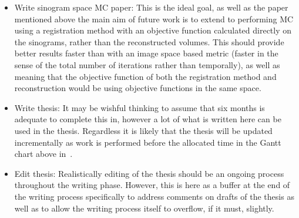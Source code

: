 \begin{itemize}
                \item Write sinogram space \gls{MC} paper: This is the ideal goal, as well as the paper mentioned above the main aim of future work is to extend to performing \gls{MC} using a registration method with an objective function calculated directly on the sinograms, rather than the reconstructed volumes. This should provide better results faster than with an image space based metric (faster in the sense of the total number of iterations rather than temporally), as well as meaning that the objective function of both the registration method and reconstruction would be using objective functions in the same space.
                
                \item Write thesis: It may be wishful thinking to assume that six months is adequate to complete this in, however a lot of what is written here can be used in the thesis. Regardless it is likely that the thesis will be updated incrementally as work is performed before the allocated time in the Gantt chart above in~.
    
                \item Edit thesis: Realistically editing of the thesis should be an ongoing process throughout the writing phase. However, this is here as a buffer at the end of the writing process specifically to address comments on drafts of the thesis as well as to allow the writing process itself to overflow, if it must, slightly.
            \end{itemize}
        
